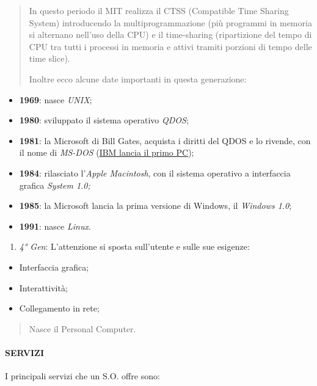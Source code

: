 \begin{quote}
In questo periodo il MIT realizza il CTSS (Compatible Time Sharing
System) introducendo la multiprogrammazione (più programmi in memoria si
alternano nell'uso della CPU) e il time-sharing (ripartizione del tempo
di CPU tra tutti i processi in memoria e attivi tramiti porzioni di
tempo delle time slice).

Inoltre ecco alcune date importanti in questa generazione:
\end{quote}

\begin{itemize}
\item
  \textbf{1969}: nasce \emph{UNIX};
\item
  \textbf{1980}: sviluppato il sistema operativo \emph{QDOS};
\item
  \textbf{1981}: la Microsoft di Bill Gates, acquista i diritti del QDOS
  e lo rivende, con il nome di \emph{MS-DOS} (\ul{IBM lancia il primo
  PC});
\item
  \textbf{1984}: rilasciato l'\emph{Apple Macintosh}, con il sistema
  operativo a interfaccia grafica \emph{System 1.0;}
\item
  \textbf{1985}: la Microsoft lancia la prima versione di Windows, il
  \emph{Windows 1.0};
\item
  \textbf{1991}: nasce \emph{Linux}.
\end{itemize}

\begin{enumerate}
\def\labelenumi{\arabic{enumi}.}
\setcounter{enumi}{3}
\item
  \emph{4° Gen}: L'attenzione si sposta sull'utente e sulle sue
  esigenze:
\end{enumerate}

\begin{itemize}
\item
  Interfaccia grafica;
\item
  Interattività;
\item
  Collegamento in rete;
\end{itemize}

\begin{quote}
Nasce il Personal Computer.
\end{quote}

\paragraph{SERVIZI}\label{servizi}

I principali servizi che un S.O. offre sono:

